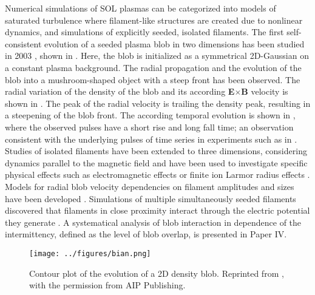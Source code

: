 Numerical simulations of SOL plasmas can be categorized into models of saturated
turbulence where filament-like structures are created due to nonlinear dynamics, and
simulations of explicitly seeded, isolated filaments. The first self-consistent
evolution of a seeded plasma blob in two dimensions has been studied in 2003
\cite{bian2003blobs}, shown in . Here, the blob is initialized as a
symmetrical 2D-Gaussian on a constant plasma background. The radial propagation and the
evolution of the blob into a mushroom-shaped object with a steep front has been
observed. The radial variation of the density of the blob and its according
\textbf{E}$\times$\textbf{B} velocity is shown in . The peak of the
radial velocity is trailing the density peak, resulting in a steepening of the blob
front. The according temporal evolution is shown in , where the
observed pulses have a short rise and long fall time; an observation consistent with the
underlying pulses of time series in experiments such as in .
Studies of isolated filaments have been extended to three dimensions, considering
dynamics parallel to the magnetic field
\cite{angus2012effect,walkden2013characterization,easy2014three,easy2016investigation,militello2016multi,riva2016blob}
and have been used to investigate specific physical effects such as electromagnetic
effects or finite ion Larmor radius effects
\cite{angus2012effect,lee2015electromagnetic,gingell2012transport,gingell2014plasma}.
Models for radial blob velocity dependencies on filament amplitudes and sizes have been
developed \cite{garcia2005mechanism,
  garcia2006radial,kube2011velocity,kube2016amplitude}. Simulations of multiple
simultaneously seeded filaments discovered that filaments in close proximity interact
through the electric potential they generate
\cite{militello2017interaction,kendl2018gyrofluid}. A systematical analysis of blob
interaction in dependence of the intermittency, defined as the level of blob overlap, is
presented in Paper IV.
\begin{figure}[t]
  \centering
  \texttt{[image: ../figures/bian.png]}
  \caption{Contour  plot  of  the  evolution  of  a  2D  density  blob. Reprinted from \cite{bian2003blobs}, with the permission from AIP Publishing.}
  \label{Fig:bian}
\end{figure}
